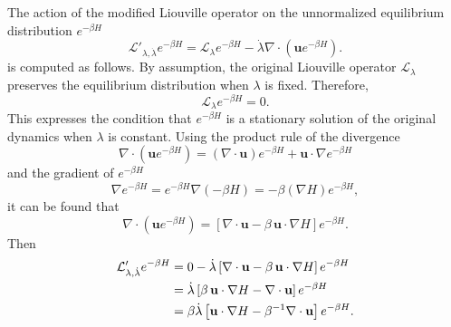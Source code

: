 The action of the modified Liouville operator on the unnormalized equilibrium distribution $e^{-\beta H}$
\begin{equation}
	\mathcal{L}'_{\lambda,\dot{\lambda}} e^{-\beta H} = \mathcal{L}_\lambda e^{-\beta H} - \dot{\lambda} \nabla \cdot (\mathbf{u} e^{-\beta H}).
\end{equation}
is computed as follows. By assumption, the original Liouville operator $\mathcal{L}_\lambda$ preserves the equilibrium distribution when $\lambda$ is fixed. Therefore,
\begin{equation}
	\mathcal{L}_\lambda e^{-\beta H} = 0. 
\end{equation}
This expresses the condition that $e^{-\beta H}$ is a stationary solution of the original dynamics when $\lambda$ is constant. Using the product rule of the divergence 
\begin{equation}
	\nabla \cdot (\mathbf{u} e^{-\beta H}) = (\nabla \cdot \mathbf{u}) e^{-\beta H} + \mathbf{u} \cdot \nabla e^{-\beta H}
\end{equation}
and the gradient of $e^{-\beta H}$
\begin{equation}
	\nabla e^{-\beta H} = e^{-\beta H} \nabla (-\beta H) = -\beta (\nabla H) e^{-\beta H},
\end{equation}
it can be found that
\begin{equation}
	\nabla \cdot (\mathbf{u} e^{-\beta H}) = \left[ \nabla \cdot \mathbf{u} - \beta \, \mathbf{u} \cdot \nabla H \right] e^{-\beta H}. 
\end{equation}
Then
\begin{align}
	\mathcal{L}'_{\lambda,\dot{\lambda}} e^{-\beta H} &= 0 - \dot{\lambda} \left[ \nabla \cdot \mathbf{u} - \beta \, \mathbf{u} \cdot \nabla H \right] e^{-\beta H} \notag\\
	&= \dot{\lambda} \left[ \beta \, \mathbf{u} \cdot \nabla H - \nabla \cdot \mathbf{u} \right] e^{-\beta H}\notag\\
	&= \beta \dot{\lambda} \left[ \mathbf{u} \cdot \nabla H - \beta^{-1} \nabla \cdot \mathbf{u} \right] e^{-\beta H}.
\end{align}

